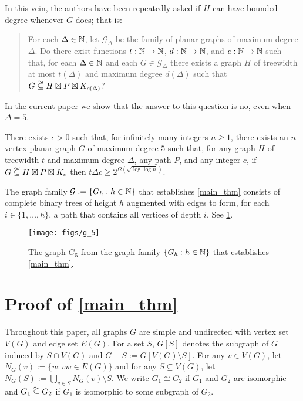 \documentclass{patmorin}
\newcommand\subsetcong{\mathrel{\text{%
    \setbox0\hbox{$\subseteq$}%
    \rlap{\hbox to \wd0{\hss\hss\hss\raisebox{1.5\height}{$\sim$}\hss}}\box0
}}}
\renewcommand{\ge}{\geqslant}
\begin{document}
In this vein, the authors have been repeatedly asked if $H$ can have bounded degree whenever $G$ does; that is:
\begin{quote}
  For each $\Delta\in\mathbb{N}$, let $\mathcal{G}_\Delta$ be the family of planar graphs of maximum degree $\Delta$.  Do there exist functions $t:\mathbb{N}\to\mathbb{N}$, $d:\mathbb{N}\to\mathbb{N}$, and $c:\mathbb{N}\to\mathbb{N}$ such that, for each $\Delta\in\mathbb{N}$ and each $G\in\mathcal{G}_\Delta$ there exists a graph $H$ of treewidth at most $t(\Delta)$ and maximum degree $d(\Delta)$ such that $G\subsetcong H\boxtimes P\boxtimes K_{c(\Delta)}$?
\end{quote}
In the current paper we show that the answer to this question is no, even when $\Delta=5$.

\begin{thm}\label{main_thm}
  There exists $\epsilon > 0$ such that, for infinitely many integers $n\ge 1$, there exists an $n$-vertex planar graph $G$ of maximum degree $5$ such that, for any graph $H$ of treewidth $t$ and maximum degree $\Delta$, any path $P$, and any integer $c$, if $G\subsetcong H\boxtimes P\boxtimes K_c$ then $t\Delta c \ge 2^{\Omega(\sqrt{\log\log n})}$.
\end{thm}

The graph family $\mathcal{G}:=\{G_h:h\in\mathbb{N}\}$ that establishes \cref{main_thm} consists of complete binary trees of height $h$ augmented with edges to form, for each $i\in\{1,\ldots,h\}$, a path that contains all vertices of depth $i$.  See \cref{G_5}.

\begin{figure}
  \begin{center}
    \texttt{[image: figs/g\_5]}
  \end{center}
  \caption{The graph $G_5$ from the graph family $\{G_h:h\in\mathbb{N}\}$ that establishes \cref{main_thm}.}
  \label{G_5}
\end{figure}

\section{Proof of \cref{main_thm}}

Throughout this paper, all graphs $G$ are simple and undirected with vertex set $V(G)$ and edge set $E(G)$.  For a set $S$, $G[S]$ denotes the subgraph of $G$ induced by $S\cap V(G)$ and $G-S:=G[V(G)\setminus S]$.  For any $v\in V(G)$, let $N_G(v):=\{w:vw\in E(G)\}$ and for any $S\subseteq V(G)$, let $N_G(S):=\bigcup_{v\in S} N_G(v)\setminus S$.  We write $G_1\cong G_2$ if $G_1$ and $G_2$ are isomorphic and $G_1\subsetcong G_2$ if $G_1$ is isomorphic to some subgraph of $G_2$.
\end{document}

